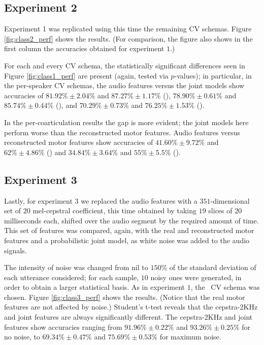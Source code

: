 \subsection{Experiment 2}
\label{subsec:exp2}

Experiment 1 was replicated using this time the remaining CV schemas.
Figure \ref{fig:class2_perf} shows the results. (For comparison,
the figure also shows in the first column the accuracies obtained for
experiment $1$.)

For each and every CV schema, the statistically significant differences seen in
Figure \ref{fig:class1_perf} are present (again, tested via $p$-values);
in particular, in the per-speaker CV schemas, the audio features versus
the joint models show accuracies of
$81.92\% \pm 2.04\%$ and $87.27\% \pm 1.17\%$ (\spka),
$78.90\% \pm 0.61\%$ and $85.74\% \pm 0.44\%$ (\spkb), and
$70.29\% \pm 0.73\%$ and $76.25\% \pm 1.53\%$ (\spkc).

In the per-coarticulation results the gap is more evident; the joint models
here perform worse than the reconstructed motor features. Audio features
versus reconstructed motor features show accuracies of
$41.60\% \pm 9.72\%$ and $62\% \pm 4.86\%$ (\coa) and
$34.84\% \pm 3.64\%$ and $55\% \pm 5.5\%$ (\cob).

\subsection{Experiment 3}
\label{subsec:exp3}

Lastly, for experiment 3 we replaced the audio features with
a $351$-dimensional set of $20$ mel-cepstral
coefficient, this time obtained by taking $19$ slices of $20$ milliseconds each,
shifted over the audio segment by the required amount of time. This set of
features was compared, again, with the real and reconstructed motor features and
a probabilistic joint model, as white noise was added to the audio signals.

The intensity of noise was changed from nil to $150\%$ of the standard deviation
of each utterance considered; for each sample, $10$ noisy ones were generated, in
order to obtain a larger statistical basis. As in experiment $1$, the \overall\ CV
schema was chosen. Figure \ref{fig:class3_perf} shows the results.
(Notice that the real motor features are not affected by noise.) Student's t-test
reveals that the cepstra-2KHz and joint features are always significantly different.
The cepstra-2KHz and joint features show accuracies ranging from
$91.96\% \pm 0.22\%$ and $93.26\% \pm 0.25\%$ for no noise, to
$69.34\% \pm 0.47\%$ and $75.69\% \pm 0.53\%$ for maximum noise.
